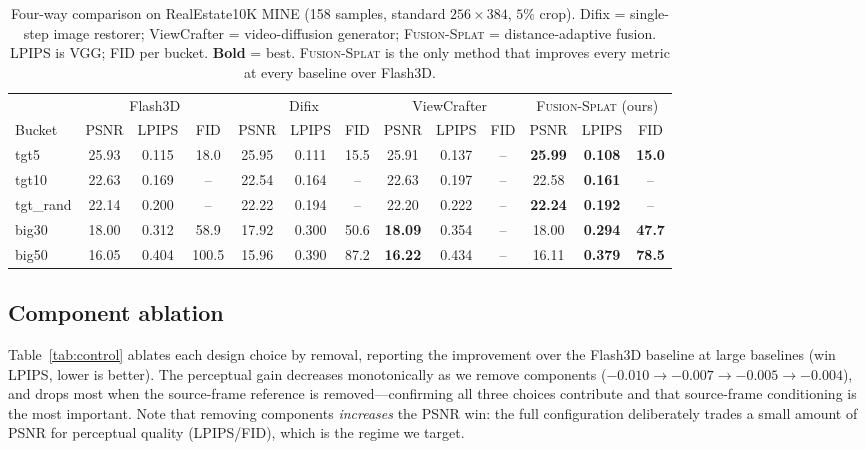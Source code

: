\documentclass[10pt,twocolumn,letterpaper]{article}
\newcommand{\method}{\textsc{Fusion-Splat}}
\begin{document}
\begin{table}[t]
\centering
\small
\caption{Four-way comparison on RealEstate10K MINE (158 samples, standard
$256{\times}384$, $5\%$ crop). Difix = single-step image restorer;
ViewCrafter = video-diffusion generator; \method{} = distance-adaptive fusion.
LPIPS is VGG; FID per bucket. \textbf{Bold} = best. \method{} is the only method
that improves every metric at every baseline over Flash3D.}
\label{tab:main}
\begin{tabular}{l|ccc|ccc|ccc|ccc}
\toprule
& \multicolumn{3}{c|}{Flash3D} & \multicolumn{3}{c|}{Difix} & \multicolumn{3}{c|}{ViewCrafter} & \multicolumn{3}{c}{\method{} (ours)} \\
Bucket & PSNR & LPIPS & FID & PSNR & LPIPS & FID & PSNR & LPIPS & FID & PSNR & LPIPS & FID \\
\midrule
tgt5     & 25.93 & 0.115 & 18.0 & 25.95 & 0.111 & 15.5 & 25.91 & 0.137 & -- & \textbf{25.99} & \textbf{0.108} & \textbf{15.0} \\
tgt10    & 22.63 & 0.169 & --   & 22.54 & 0.164 & --   & 22.63 & 0.197 & -- & 22.58 & \textbf{0.161} & -- \\
tgt\_rand& 22.14 & 0.200 & --   & 22.22 & 0.194 & --   & 22.20 & 0.222 & -- & \textbf{22.24} & \textbf{0.192} & -- \\
big30    & 18.00 & 0.312 & 58.9 & 17.92 & 0.300 & 50.6 & \textbf{18.09} & 0.354 & -- & 18.00 & \textbf{0.294} & \textbf{47.7} \\
big50    & 16.05 & 0.404 & 100.5& 15.96 & 0.390 & 87.2 & \textbf{16.22} & 0.434 & -- & 16.11 & \textbf{0.379} & \textbf{78.5} \\
\bottomrule
\end{tabular}
\end{table}

\subsection{Component ablation}
Table~\ref{tab:control} ablates each design choice by removal, reporting the
improvement over the Flash3D baseline at large baselines (win LPIPS, lower is
better). The perceptual gain decreases monotonically as we remove components
($-0.010 \to -0.007 \to -0.005 \to -0.004$), and drops most when the
source-frame reference is removed---confirming all three choices contribute and
that source-frame conditioning is the most important. Note that removing
components \emph{increases} the PSNR win: the full configuration deliberately
trades a small amount of PSNR for perceptual quality (LPIPS/FID), which is the
regime we target.
\end{document}
